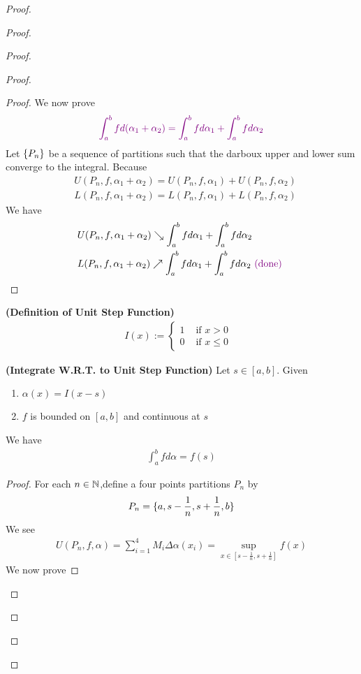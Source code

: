 \documentclass{report}
\begin{document}
\begin{proof}
\begin{proof}
\begin{proof}
\begin{proof}
\begin{proof}
We now prove 
\begin{align*}
\textcolor{violet}{\int_a^b fd(\alpha _1+\alpha _2)=\int_a^b fd\alpha _1+\int_a^b fd\alpha_2}
\end{align*}
Let $\{ P_n \}$ be a sequence of partitions such that the darboux upper and lower sum converge to the integral. Because 
\begin{align*}
&U(P_n,f,\alpha _1+\alpha_2 )=U(P_n,f,\alpha _1)+U(P_n,f,\alpha _2)\\
&L(P_n,f,\alpha _1+\alpha _2)=L(P_n,f,\alpha _1)+L(P_n,f,\alpha _2)
\end{align*}
We have 
\begin{align*}
&U(P_n,f,\alpha _1+\alpha _2)\searrow \int_a^b fd\alpha_1 +\int_a^b fd\alpha_2\\
&L(P_n,f,\alpha _1+\alpha _2)\nearrow \int_a^b fd\alpha _1+\int_a^b fd\alpha _2 \textcolor{violet}{\text{ (done) }}
\end{align*}
\end{proof}
\begin{definition}
\label{7.2.2}
\textbf{(Definition of Unit Step Function)} 
\begin{align*}
I(x):=\begin{cases}
  1& \text{ if  }x> 0\\
 0& \text{ if $x\leq 0$ } 
\end{cases}
\end{align*}
\end{definition}
\begin{theorem}
\label{7.2.3}
\textbf{(Integrate W.R.T. to Unit Step Function)} Let $s \in [a,b]$. Given 
\begin{enumerate}[label=(\alph*)]
  \item $\alpha (x)=I(x-s)$ 
  \item $f$ is bounded on  $[a,b]$ and continuous at $s$
\end{enumerate}
We have 
\begin{align*}
\int_a^b fd\alpha =f(s)
\end{align*}
\end{theorem}
\begin{proof}
For each $n\in\mathbb{N}$,define a four points partitions $P_n$ by 
\begin{align*}
P_n=\{ a,s-\frac{1}{n},s+\frac{1}{n},b \}
\end{align*}
We see 
\begin{align*}
U(P_n,f,\alpha )=\sum_{i=1}^4 M_i \Delta \alpha (x_i)= \sup_{x \in [s-\frac{1}{n},s+\frac{1}{n}]} f(x) 
\end{align*}
We now prove 

\end{proof}
\end{proof}
\end{proof}
\end{proof}
\end{proof}
\end{document}

